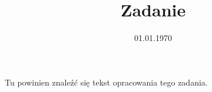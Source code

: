 \documentclass[opr]{soigstyl}
\title{Zadanie}
\date{01.01.1970}
\begin{document}
\begin{oprtext}
Tu powinien znaleźć się tekst opracowania tego zadania.
\end{oprtext}
\end{document}
